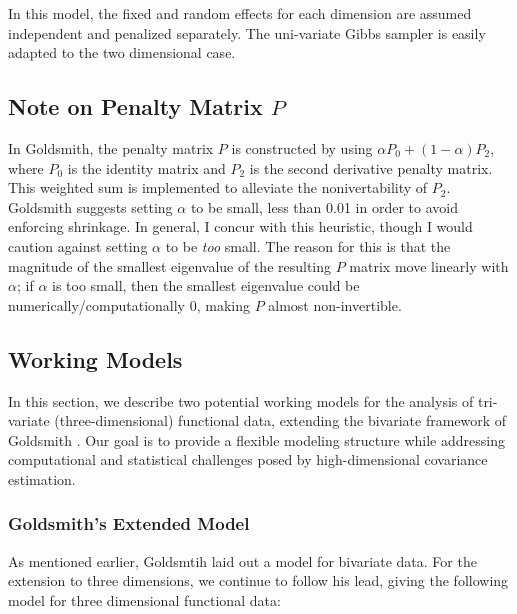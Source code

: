 \documentclass[AMA,Times1COL]{WileyNJDv5} %
\begin{document}
In this model, the fixed and random effects for each dimension are assumed independent and penalized separately.  The uni-variate Gibbs sampler is easily adapted to the two dimensional case.  

\subsection{Note on Penalty Matrix \(P\)}

In Goldsmith, the penalty matrix \(P\) is constructed by using \(\alpha  P_{0} + (1 - \alpha) P_{2} \), where \(P_{0}\) is the identity matrix and \(P_{2}\) is the second derivative penalty matrix.  This weighted sum is implemented to alleviate the nonivertability of \(P_{2}\).  Goldsmith suggests setting \(\alpha\) to be small, less than 0.01 in order to avoid enforcing shrinkage.  In general, I concur with this heuristic, though I would caution against setting \(\alpha\) to be \emph{too} small.  The reason for this is that the magnitude of the smallest eigenvalue of the resulting \(P\) matrix move linearly with \(\alpha\); if \(\alpha\) is too small, then the smallest eigenvalue could be numerically/computationally 0, making \(P\) almost non-invertible.  

\subsection{Working Models}
In this section, we describe two potential working models for the analysis of tri-variate (three-dimensional) functional data, extending the bivariate framework of Goldsmith \cite{goldsmith_assessing_2016}. Our goal is to provide a flexible modeling structure while addressing computational and statistical challenges posed by high-dimensional covariance estimation.

\subsubsection{Goldsmith's Extended Model}
As mentioned earlier, Goldsmtih laid out a model for bivariate data.   For the extension to three dimensions, we continue to follow his lead, giving the following model for three dimensional functional data:
\end{document}
